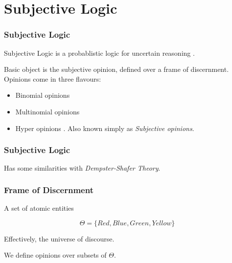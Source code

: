 \documentclass{beamer}
\begin{document}
%
%

\section{Subjective Logic}

\begin{frame}
\frametitle{Subjective Logic}

Subjective Logic is a probablistic logic for uncertain reasoning
\cite{josang_logic_2001}.

Basic object is the subjective opinion, defined over a frame of discernment.
Opinions come in three flavours:

\begin{itemize}
  \item Binomial opinions
  \item Multinomial opinions
  \item Hyper opinions \cite{josang2012interpretation}. Also known simply as
    \emph{Subjective opinions}.
\end{itemize}

\end{frame}


\begin{frame}
\frametitle{Subjective Logic}

Has some similarities with \emph{Dempster-Shafer Theory}.


\end{frame}


\begin{frame}
\frametitle{Frame of Discernment}

A set of atomic entities

$$\Theta = \lbrace Red, Blue, Green, Yellow \rbrace$$

Effectively, the universe of discourse.

We define opinions over subsets of $\Theta$.

\end{frame}

\end{document}
